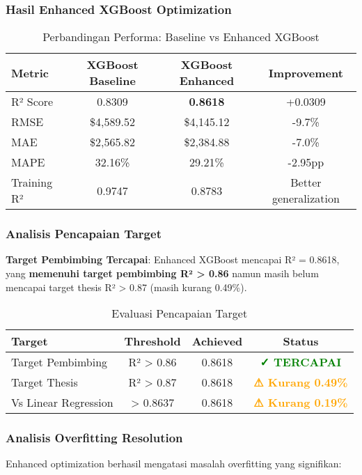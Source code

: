 \subsubsection{Hasil Enhanced XGBoost Optimization}

\begin{table}[H]
\centering
\caption{Perbandingan Performa: Baseline vs Enhanced XGBoost}
\label{tab:enhanced-performance}
\begin{tabular}{|l|c|c|c|}
\hline
\textbf{Metric} & \textbf{XGBoost Baseline} & \textbf{XGBoost Enhanced} & \textbf{Improvement} \\
\hline
R² Score & 0.8309 & \textbf{0.8618} & +0.0309 \\
RMSE & \$4,589.52 & \$4,145.12 & -9.7\% \\
MAE & \$2,565.82 & \$2,384.88 & -7.0\% \\
MAPE & 32.16\% & 29.21\% & -2.95pp \\
Training R² & 0.9747 & 0.8783 & Better generalization \\
\hline
\end{tabular}
\end{table}

\subsubsection{Analisis Pencapaian Target}

\textbf{Target Pembimbing Tercapai}: Enhanced XGBoost mencapai R² = 0.8618, yang \textbf{memenuhi target pembimbing R² > 0.86} namun masih belum mencapai target thesis R² > 0.87 (masih kurang 0.49\%).

\begin{table}[H]
\centering
\caption{Evaluasi Pencapaian Target}
\label{tab:target-achievement}
\begin{tabular}{|l|c|c|c|}
\hline
\textbf{Target} & \textbf{Threshold} & \textbf{Achieved} & \textbf{Status} \\
\hline
Target Pembimbing & R² > 0.86 & 0.8618 & \textcolor{green}{\textbf{✓ TERCAPAI}} \\
Target Thesis & R² > 0.87 & 0.8618 & \textcolor{orange}{\textbf{⚠ Kurang 0.49\%}} \\
Vs Linear Regression & > 0.8637 & 0.8618 & \textcolor{orange}{\textbf{⚠ Kurang 0.19\%}} \\
\hline
\end{tabular}
\end{table}

\subsubsection{Analisis Overfitting Resolution}
Enhanced optimization berhasil mengatasi masalah overfitting yang signifikan:

